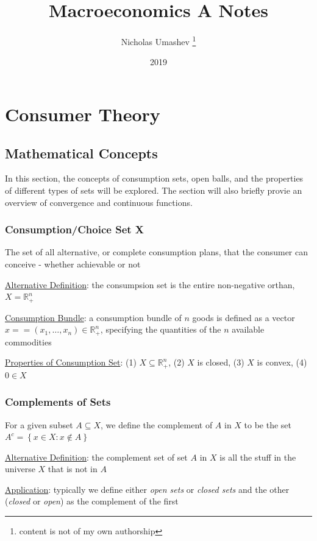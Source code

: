 \documentclass{article}
\title{Macroeconomics A Notes}
\author{Nicholas Umashev \footnote{content is not of my own authorship}}
\date{2019}
\begin{document}
\maketitle

\tableofcontents

\newpage

\section{Consumer Theory}

\vspace{2.5mm}
\subsection{Mathematical Concepts}
In this section, the concepts of consumption sets, open balls, and the properties of different types of sets will be explored. The section will also briefly provie an overview of convergence and continuous functions. \par
\vspace{6mm}
\subsubsection{Consumption/Choice Set X}
The set of all alternative, or complete consumption plans, that the consumer can conceive - whether achievable or not \par \vspace{0.3em}
  \underline{Alternative Definition}: the consumpsion set is the entire non-negative orthan, $X = \mathbb{R}^{n}_{+}$ \par
  \underline{Consumption Bundle}: a consumption bundle of $n$ goods is defined as a vector $x == (x_{1}, \dots, x_{n}) \in \mathbb{R}_{+}^{n}$, specifying the quantities of the $n$ available commodities \par
  \underline{Properties of Consumption Set}: (1) $X \subseteq \mathbb{R}_{+}^{n}$, (2) $X$ is closed, (3) $X$ is convex, (4) $0 \in X$ \par
\vspace{6mm}
\subsubsection{Complements of Sets}
For a given subset $A \subseteq X$, we define the complement of $A$ in $X$ to be the set $A^{c} = \left\{ x \in X: x \notin A \right\}$ \par \vspace{0.3em}
  \underline{Alternative Definition}: the complement set of set $A$ in $X$ is all the stuff in the universe $X$ that is not in $A$ \par
  \underline{Application}: typically we define either \textit{open sets} or \textit{closed sets} and the other (\textit{closed} or \textit{open}) as the complement of the first \par
\vspace{6mm}
\end{document}
